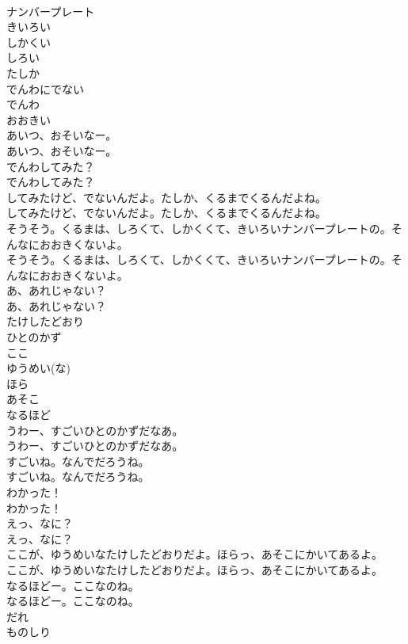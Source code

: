 \documentclass[8pt]{extreport}
\begin{document}
\begin{CJK}{UTF8}{min}
\\	ナンバープレート
\\	きいろい
\\	しかくい
\\	しろい
\\	たしか
\\	でんわにでない
\\	でんわ
\\	おおきい
\\	あいつ、おそいなー。	
\\	あいつ、おそいなー。 
\\	でんわしてみた？	
\\	でんわしてみた？ 
\\	してみたけど、でないんだよ。たしか、くるまでくるんだよね。	
\\	してみたけど、でないんだよ。たしか、くるまでくるんだよね。 
\\	そうそう。くるまは、しろくて、しかくくて、きいろいナンバープレートの。そんなにおおきくないよ。	
\\	そうそう。くるまは、しろくて、しかくくて、きいろいナンバープレートの。そんなにおおきくないよ。 
\\	あ、あれじゃない？	
\\	あ、あれじゃない？ 
\\	たけしたどおり
\\	ひとのかず
\\	ここ
\\	ゆうめい(な)
\\	ほら
\\	あそこ
\\	なるほど
\\	うわー、すごいひとのかずだなあ。	
\\	うわー、すごいひとのかずだなあ。 
\\	すごいね。なんでだろうね。	
\\	すごいね。なんでだろうね。 
\\	わかった！	
\\	わかった！ 
\\	えっ、なに？	
\\	えっ、なに？ 
\\	ここが、ゆうめいなたけしたどおりだよ。ほらっ、あそこにかいてあるよ。	
\\	ここが、ゆうめいなたけしたどおりだよ。ほらっ、あそこにかいてあるよ。 
\\	なるほどー。ここなのね。	
\\	なるほどー。ここなのね。 
\\	だれ
\\	ものしり

\end{CJK}
\end{document}
